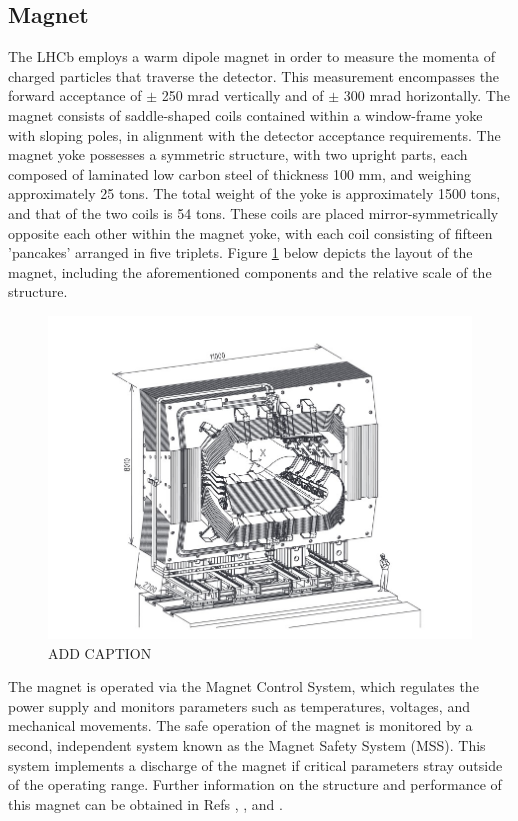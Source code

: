 \subsection{Magnet} 
The LHCb employs a warm dipole magnet in order to measure the momenta of charged particles that traverse the detector. This measurement encompasses the forward acceptance of $\pm$ 250 mrad vertically and of $\pm$ 300 mrad horizontally.
The magnet consists of saddle-shaped coils contained within a window-frame yoke with sloping poles, in alignment with the detector acceptance requirements. The magnet yoke possesses a symmetric structure, with two upright parts, each composed of laminated low carbon steel of thickness
100 mm, and weighing approximately 25 tons. The total weight of the yoke is approximately 1500 tons, and that of the two coils is 54 tons. These coils are placed mirror-symmetrically opposite each other within the magnet yoke, with each coil consisting of fifteen 'pancakes' arranged in five triplets.
Figure \ref{Magnet_image} below depicts the layout of the magnet, including the aforementioned components and the relative scale of the structure.
\begin{figure}[H]
    \centering
    \includegraphics[scale=0.5]{Magnet_image.jpg}
    \caption{ADD CAPTION}
    \label{Magnet_image}
\end{figure}
The magnet is operated via the Magnet Control System, which regulates the power supply and monitors parameters such as temperatures, voltages, and mechanical movements. The safe operation of the magnet is monitored by a second, independent system known as the Magnet Safety System (MSS). This system implements a discharge of the magnet if critical parameters stray outside of the operating range.
Further information on the structure and performance of this magnet can be obtained in Refs \cite{Amato:424338}, \cite{1018421}, and \cite{1324843}.

